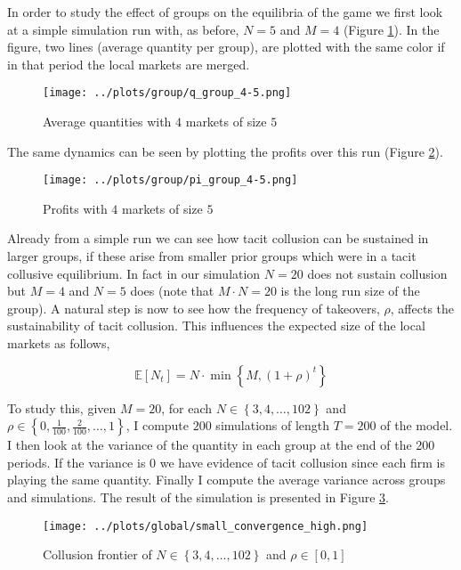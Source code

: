 \documentclass[american]{scrartcl}
\newcommand{\set}[1]{\left\{#1\right\}}
\newcommand{\E}{\mathbb{E}}
\begin{document}
In order to study the effect of groups on the equilibria of the game we first look at a simple simulation run with, as before, $N = 5$ and $M = 4$ (Figure \ref{fig:small_avg}). In the figure, two lines (average quantity per group), are plotted with the same color if in that period the local markets are merged.

\begin{figure}[H]
    \center
    \texttt{[image: ../plots/group/q\_group\_4-5.png]}
    \caption{Average quantities with $4$ markets of size $5$}
    \label{fig:small_avg}
\end{figure}

The same dynamics can be seen by plotting the profits over this run (Figure \ref{fig:small_avg_profit}).

\begin{figure}[H]
    \center
    \texttt{[image: ../plots/group/pi\_group\_4-5.png]}
    \caption{Profits with $4$ markets of size $5$}
    \label{fig:small_avg_profit}
\end{figure}


Already from a simple run we can see how tacit collusion can be sustained in larger groups, if these arise from smaller prior groups which were in a tacit collusive equilibrium. In fact in our simulation $N = 20$ does not sustain collusion but $M = 4$ and $N = 5$ does (note that $M\cdot N = 20$ is the long run size of the group). A natural step is now to see how the frequency of takeovers, $\rho$, affects the sustainability of tacit collusion. This influences the expected size of the local markets as follows,

\begin{equation}
    \E[N_t] = N \cdot \min\left\{M, (1 + \rho)^t \right\}
\end{equation}

To study this, given $M = 20$, for each $N \in \set{3, 4, \ldots, 102}$ and $\rho \in \set{0, \frac{1}{100},\frac{2}{100}, \ldots, 1}$, I compute $200$ simulations of length $T = 200$ of the model. I then look at the variance of the quantity in each group at the end of the 200 periods. If the variance is 0 we have evidence of tacit collusion since each firm is playing the same quantity. Finally I compute the average variance across groups and simulations. The result of the simulation is presented in Figure \ref{fig:frontier}.

\begin{figure}[H]
    \center
    \texttt{[image: ../plots/global/small\_convergence\_high.png]}
    \caption{Collusion frontier of $N \in \set{3, 4, \ldots, 102}$ and $\rho \in [0, 1]$ }
    \label{fig:frontier}
\end{figure}
\end{document}
